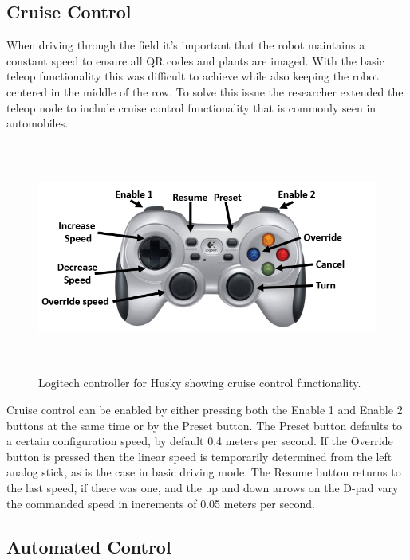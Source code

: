 \subsection{Cruise Control}

When driving through the field it's important that the robot maintains a constant speed to ensure all QR codes and plants are imaged.  With the basic teleop functionality this was difficult to achieve while also keeping the robot centered in the middle of the row. To solve this issue the researcher extended the teleop node to include cruise control functionality that is commonly seen in automobiles.  

\begin{figure}[htb]
	\centering
    \includegraphics[height=3in]{figures/logitech_controller_labelled.png}
    \caption[Cruise control buttons]{Logitech controller for Husky showing cruise control functionality.}
    \label{figure:cruise_control}
\end{figure}

Cruise control can be enabled by either pressing both the Enable 1 and Enable 2 buttons at the same time or by the Preset button.  The Preset button defaults to a certain configuration speed, by default 0.4 meters per second.  If the Override button is pressed then the linear speed is temporarily determined from the left analog stick, as is the case in basic driving mode.  The Resume button returns to the last speed, if there was one, and the up and down arrows on the D-pad vary the commanded speed in increments of 0.05 meters per second.    

\subsection{Automated Control}
\label{section:automated_control}

